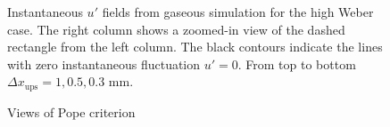 \begin{figure}[ht]
\centering
{}
\caption[Instantaneous $u'$ fields from gaseous simulation for the high Weber case]{Instantaneous $u'$ fields from gaseous simulation for the high Weber case. The right column shows a zoomed-in view of the dashed rectangle from the left column. The black contours indicate the lines with zero instantaneous fluctuation $u' = 0$. From top to bottom $\Delta x_\mathrm{ups} = 1, 0.5, 0.3$ mm.}
\label{fig:ics_mesh_independency_study_up_fields}
\end{figure}

\begin{figure}[ht]
\centering
{}
\caption[]{Views of Pope criterion}
\label{fig:ics_mesh_independency_study_POPE_M_fields}
\end{figure}



